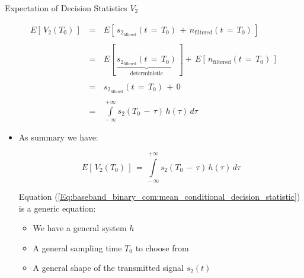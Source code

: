 \documentclass{Beamer}
\begin{document}
\begin{frame}[t,allowframebreaks]{Expectation of Decision Statistics $V_2$}

\begin{equation*}
\begin{array}{rcl}
E[\,V_2(T_0)  \,] \, &=& \, E \left[\,  s_{2_{\text{filtered}}}(t \, = \, T_0) \, + \, n_{\text{filtered}}(t \, = \, T_0)    \,\right] \\ \\
 &=& \, E \left[ \, \underbrace{s_{2_{\text{filtered}}}(t \, = \, T_0)}_{\text{deterministic}}  \,  \right] + \, E \left[ \, n_{\text{filtered}}(t \, = \, T_0)    \, \right] \\ \\
  &=& \, s_{2_{\text{filtered}}}(t \, = \, T_0) \, + \, 0 \\ \\
  &=& \,  \displaystyle\int\limits_{- \, \infty}^{+ \infty} s_2(T_0 \, - \, \tau) \, h(\tau) \, d\tau
\end{array}
\end{equation*}

\newpage
\begin{itemize}

\item As summary we have:

\begin{equation}
E[\,V_2(T_0)  \,] \, = \, \displaystyle\int\limits_{- \, \infty}^{+ \infty} s_2(T_0 \, - \, \tau) \, h(\tau) \, d\tau
\label{Eq:baseband_binary_com:mean_conditional_decision_statistic}
\end{equation}

Equation (\autoref{Eq:baseband_binary_com:mean_conditional_decision_statistic}) is a generic equation:

	\begin{itemize}
	\item We have a general system $h$

	\item A general sampling time $T_0$ to choose from
	
	\item A general shape of the transmitted signal $s_2(t)$
	\end{itemize}

\end{itemize}

\end{frame}
\end{document}
